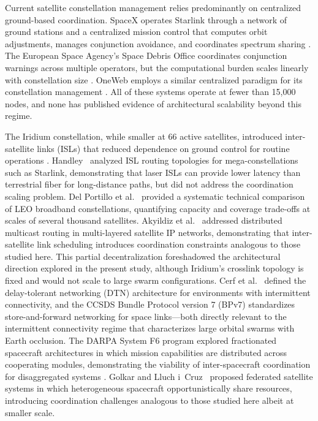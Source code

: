 \documentclass[journal]{IEEEtran}
\begin{document}
Current satellite constellation management relies predominantly on centralized ground-based coordination. SpaceX operates Starlink through a network of ground stations and a centralized mission control that computes orbit adjustments, manages conjunction avoidance, and coordinates spectrum sharing \cite{starlink_ops}. The European Space Agency's Space Debris Office coordinates conjunction warnings across multiple operators, but the computational burden scales linearly with constellation size \cite{esa_conjunction}. OneWeb employs a similar centralized paradigm for its constellation management \cite{oneweb_mgmt}. All of these systems operate at fewer than 15{,}000 nodes, and none has published evidence of architectural scalability beyond this regime.

The Iridium constellation, while smaller at 66 active satellites, introduced inter-satellite links (ISLs) that reduced dependence on ground control for routine operations \cite{iridium_arch}. Handley~\cite{handley_2018} analyzed ISL routing topologies for mega-constellations such as Starlink, demonstrating that laser ISLs can provide lower latency than terrestrial fiber for long-distance paths, but did not address the coordination scaling problem. Del Portillo et al.~\cite{del_portillo_mega} provided a systematic technical comparison of LEO broadband constellations, quantifying capacity and coverage trade-offs at scales of several thousand satellites. Akyildiz et al.~\cite{akyildiz_isl} addressed distributed multicast routing in multi-layered satellite IP networks, demonstrating that inter-satellite link scheduling introduces coordination constraints analogous to those studied here. This partial decentralization foreshadowed the architectural direction explored in the present study, although Iridium's crosslink topology is fixed and would not scale to large swarm configurations. Cerf et al.~\cite{cerf_dtn} defined the delay-tolerant networking (DTN) architecture for environments with intermittent connectivity, and the CCSDS Bundle Protocol version 7 (BPv7) \cite{ccsds_bpv7} standardizes store-and-forward networking for space links---both directly relevant to the intermittent connectivity regime that characterizes large orbital swarms with Earth occlusion. The DARPA System F6 program explored fractionated spacecraft architectures in which mission capabilities are distributed across cooperating modules, demonstrating the viability of inter-spacecraft coordination for disaggregated systems \cite{darpa_f6}. Golkar and Lluch i~Cruz~\cite{golkar_federated} proposed federated satellite systems in which heterogeneous spacecraft opportunistically share resources, introducing coordination challenges analogous to those studied here albeit at smaller scale.
\end{document}
